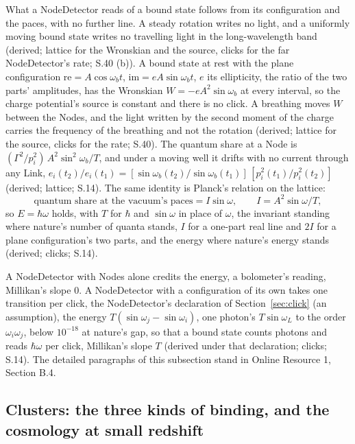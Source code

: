 \documentclass[pdflatex,sn-mathphys-num]{sn-jnl}
\theoremstyle{thmstyleone}
\theoremstyle{thmstyletwo}
\begin{document}
What a NodeDetector reads of a bound state follows from its configuration and the paces, with no further line. A steady rotation writes no light, and a uniformly moving bound state writes no travelling light in the long-wavelength band (derived; lattice for the Wronskian and the source, clicks for the far NodeDetector's rate; S.40 (b)). A bound state at rest with the plane configuration $\mathrm{re} = A\cos\omega_b t$, $\mathrm{im} = eA\sin\omega_b t$, $e$ its ellipticity, the ratio of the two parts' amplitudes, has the Wronskian $W = -eA^2\sin\omega_b$ at every interval, so the charge potential's source is constant and there is no click. A breathing moves $W$ between the Nodes, and the light written by the second moment of the charge carries the frequency of the breathing and not the rotation (derived; lattice for the source, clicks for the rate; S.40). The quantum share at a Node is $(\Gamma^2 / p_i^2)\,A^2\sin^2\omega_b / T$, and under a moving well it drifts with no current through any Link, $e_i(t_2) / e_i(t_1) = [\sin\omega_b(t_2) / \sin\omega_b(t_1)]\,[p_i^2(t_1) / p_i^2(t_2)]$ (derived; lattice; S.14). The same identity is Planck's relation on the lattice:
\begin{equation}\label{eq:planck}
\boxed{\text{quantum share at the vacuum's paces} = I\sin\omega, \qquad I = A^2\sin\omega / T},
\end{equation}
so $E = \hbar\omega$ holds, with $T$ for $\hbar$ and $\sin\omega$ in place of $\omega$, the invariant standing where nature's number of quanta stands, $I$ for a one-part real line and $2I$ for a plane configuration's two parts, and the energy where nature's energy stands (derived; clicks; S.14).

A NodeDetector with Nodes alone credits the energy, a bolometer's reading, Millikan's slope $0$. A NodeDetector with a configuration of its own takes one transition per click, the NodeDetector's declaration of Section~\ref{sec:click} (an assumption), the energy $T(\sin\omega_j - \sin\omega_i)$, one photon's $T\sin\omega_L$ to the order $\omega_i\omega_j$, below $10^{-18}$ at nature's gap, so that a bound state counts photons and reads $\hbar\omega$ per click, Millikan's slope $T$ (derived under that declaration; clicks; S.14). The detailed paragraphs of this subsection stand in Online Resource 1, Section B.4.

\subsection{Clusters: the three kinds of binding, and the cosmology at small redshift}\label{sec:clusters}
\end{document}
